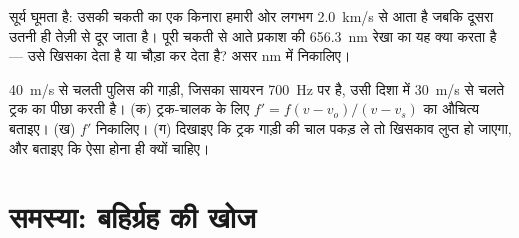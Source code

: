 \begin{exercise}[$\star\star\star$]\label{exo:g12:doppler-effect:14}
सूर्य घूमता है: उसकी चकती का एक किनारा हमारी ओर लगभग \qty{2.0}{km/s} से आता है जबकि
दूसरा उतनी ही तेज़ी से दूर जाता है। पूरी चकती से आते प्रकाश की \qty{656.3}{nm} रेखा का
यह क्या करता है --- उसे खिसका देता है या चौड़ा कर देता है? असर \unit{nm} में
निकालिए।
\end{exercise}

\begin{exercise}[$\star\star\star$]\label{exo:g12:doppler-effect:15}
\qty{40}{m/s} से चलती पुलिस की गाड़ी, जिसका सायरन \qty{700}{Hz} पर है, उसी दिशा में \qty{30}{m/s}
से चलते ट्रक का पीछा करती है। (क) ट्रक-चालक के लिए $f' = f(v - v_o)/(v - v_s)$ का औचित्य बताइए।
(ख) $f'$ निकालिए। (ग) दिखाइए कि ट्रक गाड़ी की चाल पकड़ ले तो खिसकाव लुप्त हो
जाएगा, और बताइए कि ऐसा होना ही क्यों चाहिए।
\end{exercise}

\section{समस्या: बहिर्ग्रह की खोज}

